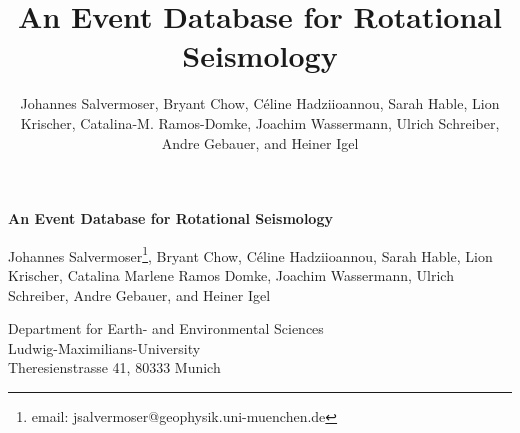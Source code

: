 \documentclass[12pt,reqno,letter]{article} %
\begin{document}
% 

\title{An Event Database for Rotational Seismology}

\author{Johannes Salvermoser, Bryant Chow, C\'{e}line Hadziioannou, Sarah Hable, Lion Krischer, Catalina-M. Ramos-Domke, Joachim Wassermann, Ulrich Schreiber, Andre Gebauer, and Heiner Igel}

% 
% 
% 
% 

\begin{center}

\textbf{An Event Database for Rotational Seismology}

\vspace{6em}
Johannes Salvermoser\footnote{email: jsalvermoser@geophysik.uni-muenchen.de}, Bryant Chow, C\'{e}line Hadziioannou, Sarah Hable, Lion Krischer, Catalina Marlene Ramos Domke, Joachim Wassermann, Ulrich Schreiber, Andre Gebauer, and Heiner Igel
\vspace{3em}

Department for Earth- and Environmental Sciences\\ Ludwig-Maximilians-University\\ Theresienstrasse 41, 80333 Munich



\end{center}
\end{document}
